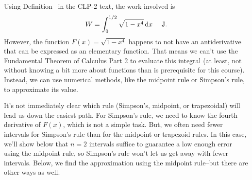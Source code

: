 \begin{solution}
Using Definition~ in the CLP-2 text, the work involved is
\[W = \int_{0}^{1/2} \sqrt{1-x^4}\,\mathrm{d}x \quad\text{ J}.\]
However, the function $F(x)=\sqrt{1-x^4}$ happens to not have an antiderivative that can be expressed as an elementary function. That means we can't use the Fundamental Theorem of Calculus Part 2 to evaluate this integral (at least, not without knowing a bit more about functions than is prerequisite for this course). Instead, we can use numerical methods, like the midpoint rule or Simpson's rule, to approximate its value.

It's not immediately clear which rule (Simpson's, midpoint, or trapezoidal) will lead us down the easiest path. For Simpson's rule, we need to know the fourth derivative of $F(x)$, which is not a simple task. But, we often need fewer intervals for Simpson's rule than for the midpoint or trapezoid rules. In this case, we'll show below that  $n = 2$ intervals  suffice to guarantee a low enough error using the midpoint rule, so Simpson's rule won't let us get away with fewer intervals. Below, we find the approximation using the midpoint rule--but there are other ways as well.


\end{solution}
